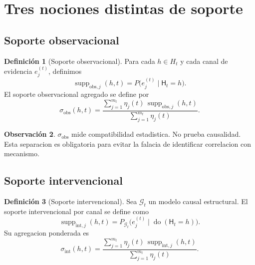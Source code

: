 \documentclass[12pt,a4paper]{article}
\newcommand{\doop}{\operatorname{do}}
\newcommand{\supp}{\operatorname{supp}}
\theoremstyle{definition}
\newtheorem{definition}{Definici\'on}[section]
\newtheorem{remark}[definition]{Observaci\'on}
\theoremstyle{plain}
\theoremstyle{remark}
\begin{document}
\section{Tres nociones distintas de soporte}


\subsection{Soporte observacional}

\begin{definition}[Soporte observacional]
Para cada $h\in H_t$ y cada canal de evidencia $e_j^{(t)}$, definimos
\begin{equation}
\supp_{\mathrm{obs},j}(h,t)=P\bigl(e_j^{(t)}\mid \mathsf{H}_t=h\bigr).
\end{equation}
El soporte observacional agregado se define por
\begin{equation}
\sigma_{\mathrm{obs}}(h,t)=
\frac{\sum_{j=1}^{m_t}\eta_j(t)\,\supp_{\mathrm{obs},j}(h,t)}{\sum_{j=1}^{m_t}\eta_j(t)}.
\end{equation}
\end{definition}

\begin{remark}
$\sigma_{\mathrm{obs}}$ mide compatibilidad estadistica. No prueba causalidad. Esta separacion es obligatoria para evitar la falacia de identificar correlacion con mecanismo.
\end{remark}

\subsection{Soporte intervencional}

\begin{definition}[Soporte intervencional]
Sea $\mathcal{G}_t$ un modelo causal estructural. El soporte intervencional por canal se define como
\begin{equation}
\supp_{\mathrm{int},j}(h,t)=P_{\mathcal{G}_t}\bigl(e_j^{(t)}\mid \doop(\mathsf{H}_t=h)\bigr).
\end{equation}
Su agregacion ponderada es
\begin{equation}
\sigma_{\mathrm{int}}(h,t)=
\frac{\sum_{j=1}^{m_t}\eta_j(t)\,\supp_{\mathrm{int},j}(h,t)}{\sum_{j=1}^{m_t}\eta_j(t)}.
\end{equation}
\end{definition}
\end{document}
